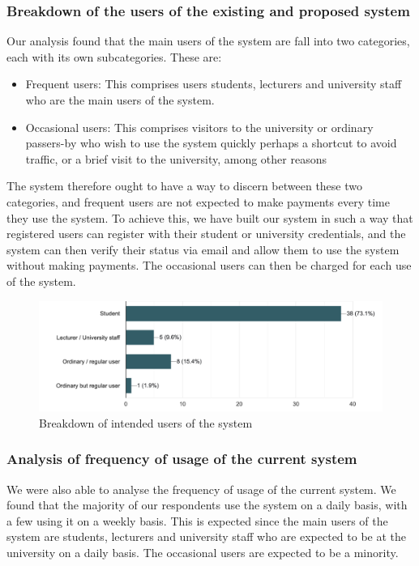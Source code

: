 \subsubsection{Breakdown of the users of the existing and proposed system}
Our analysis found that the main users of the system are fall into two categories, each with its own subcategories. These are:
\begin{itemize}
    \item Frequent users: This comprises users students, lecturers and university staff who are the main users of the system.
    \item Occasional users: This comprises visitors to the university or ordinary passers-by who wish to use the system quickly perhaps a shortcut to avoid traffic, or a brief visit to the university, among other reasons
\end{itemize}
The system therefore ought to have a way to discern between these two categories, and frequent users are not expected to make payments every time they use the system. To achieve this, we have built our system in such a way that registered users can register with their student or university credentials, and the system can then verify their status via email and allow them to use the system without making payments. The occasional users can then be charged for each use of the system.
\begin{figure}[h]
    \hspace{-1cm}
    \includegraphics[scale = 0.5]{images/users}
    \caption{Breakdown of intended users of the system}
\end{figure}

\subsubsection{Analysis of frequency of usage of the current system}
We were also able to analyse the frequency of usage of the current system. We found that the majority of our respondents use the system on a daily basis, with a few using it on a weekly basis. This is expected since the main users of the system are students, lecturers and university staff who are expected to be at the university on a daily basis. The occasional users are expected to be a minority.

